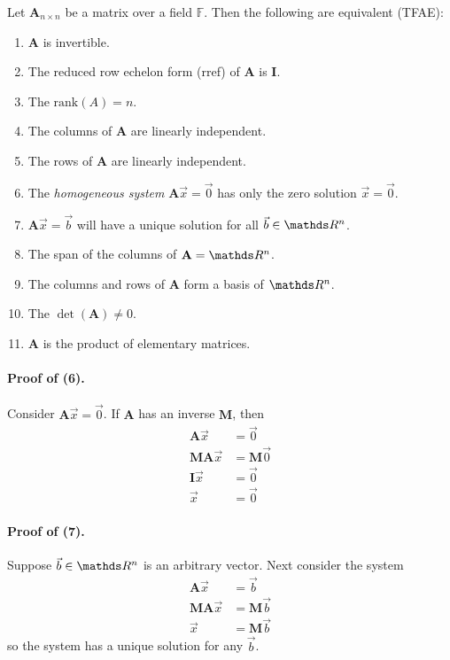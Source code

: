 \documentclass[11pt]{article}
\newcommand{\mat}[1]{\mathbf{#1}}
\newcommand{\vek}[1]{\vec{#1}}
\newcommand{\rank}{\text{rank}}
\begin{document}
\begin{minipage}{.95\textwidth}
Let $\mat{A}_{n \times n}$ be a matrix over a field $\mathbb{F}$. Then the following are equivalent (TFAE):
\begin{enumerate}
\item{
$\mat{A}$ is invertible.
}
\item{
The reduced row echelon form (rref) of $\mat{A}$ is $\mat{I}$.
}
\item{
The $\rank(A) = n$.
}
\item{
The columns of $\mat{A}$ are linearly independent.
}
\item{
The rows of $\mat{A}$ are linearly independent.
}
\item{
The \emph{homogeneous system} $\mat{A} \vek{x} = \vek{0}$ has only the zero solution $\vek{x} = \vek{0}$.
}
\item{
$\mat{A} \vek{x} = \vek{b}$ will have a unique solution for all $\vek{b} \in \bbR^n$.
}
\item{
The span of the columns of $\mat{A} = \bbR^n$.
}
\item{
The columns and rows of $\mat{A}$ form a basis of $\bbR^n$.
}
\item{
The $\det(\mat{A}) \neq 0$.
}
\item{
$\mat{A}$ is the product of elementary matrices.
}
\end{enumerate}
\end{minipage}


\paragraph{Proof of (6).} Consider $\mat{A} \vek{x} = \vek{0}$. If $\mat{A}$ has an inverse $\mat{M}$, then
\begin{align*}
\mat{A} \vek{x} &= \vek{0}
\\
\mat{M} \mat{A} \vek{x} &= \mat{M} \vek{0}
\\
\mat{I} \vek{x} &= \vek{0}
\\
\vek{x} &= \vek{0}
\end{align*}

\paragraph{Proof of (7).} Suppose $\vek{b} \in \bbR^n$ is an arbitrary vector. Next consider the system
\begin{align*}
\mat{A} \vek{x} &= \vek{b}
\\
\mat{M} \mat{A} \vek{x} &= \mat{M} \vek{b}
\\
\vek{x} &= \mat{M} \vek{b}
\end{align*}
so the system has a unique solution for any $\vek{b}$.
\end{document}
